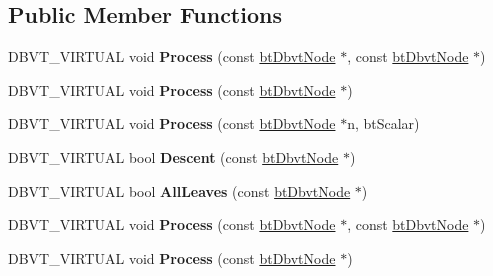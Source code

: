 \subsection*{Public Member Functions}
\begin{DoxyCompactItemize}
\item 
\mbox{\label{structbtDbvt_1_1ICollide_add579e95a283a4dd597ffe16a3f43873}} 
D\+B\+V\+T\+\_\+\+V\+I\+R\+T\+U\+AL void {\bfseries Process} (const \hyperlink{structbtDbvtNode}{bt\+Dbvt\+Node} $\ast$, const \hyperlink{structbtDbvtNode}{bt\+Dbvt\+Node} $\ast$)
\item 
\mbox{\label{structbtDbvt_1_1ICollide_a522ec74c39ae400f78e02dc41b0108ea}} 
D\+B\+V\+T\+\_\+\+V\+I\+R\+T\+U\+AL void {\bfseries Process} (const \hyperlink{structbtDbvtNode}{bt\+Dbvt\+Node} $\ast$)
\item 
\mbox{\label{structbtDbvt_1_1ICollide_a93fd4e1906d747ae6b5cfc29ed165c9d}} 
D\+B\+V\+T\+\_\+\+V\+I\+R\+T\+U\+AL void {\bfseries Process} (const \hyperlink{structbtDbvtNode}{bt\+Dbvt\+Node} $\ast$n, bt\+Scalar)
\item 
\mbox{\label{structbtDbvt_1_1ICollide_aad761bca654e99885bdd942df330ed9a}} 
D\+B\+V\+T\+\_\+\+V\+I\+R\+T\+U\+AL bool {\bfseries Descent} (const \hyperlink{structbtDbvtNode}{bt\+Dbvt\+Node} $\ast$)
\item 
\mbox{\label{structbtDbvt_1_1ICollide_a4a257177db9d370222d539479cc87749}} 
D\+B\+V\+T\+\_\+\+V\+I\+R\+T\+U\+AL bool {\bfseries All\+Leaves} (const \hyperlink{structbtDbvtNode}{bt\+Dbvt\+Node} $\ast$)
\item 
\mbox{\label{structbtDbvt_1_1ICollide_add579e95a283a4dd597ffe16a3f43873}} 
D\+B\+V\+T\+\_\+\+V\+I\+R\+T\+U\+AL void {\bfseries Process} (const \hyperlink{structbtDbvtNode}{bt\+Dbvt\+Node} $\ast$, const \hyperlink{structbtDbvtNode}{bt\+Dbvt\+Node} $\ast$)
\item 
\mbox{\label{structbtDbvt_1_1ICollide_a522ec74c39ae400f78e02dc41b0108ea}} 
D\+B\+V\+T\+\_\+\+V\+I\+R\+T\+U\+AL void {\bfseries Process} (const \hyperlink{structbtDbvtNode}{bt\+Dbvt\+Node} $\ast$)

\end{DoxyCompactItemize}
